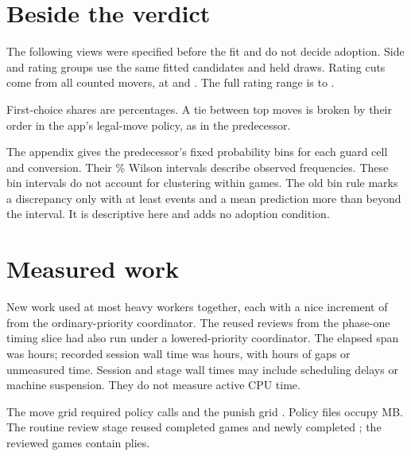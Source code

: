 \documentclass{article}
\begin{document}
\section{Beside the verdict}
The following views were specified before the fit and do not decide
adoption. Side and rating groups use the same fitted candidates and held
draws. Rating cuts come from all counted movers, at \RatingCutLow{} and
\RatingCutHigh. The full rating range is \RatingMin{} to \RatingMax.

\begin{center}\small\GroupTable\end{center}
\ExploratoryComparison{}
\SideFinding{}
\RatingFinding{}

First-choice shares are percentages. A tie between top moves is broken by
their order in the app's legal-move policy, as in the predecessor.

\begin{center}\small\TopTable\end{center}

The appendix gives the predecessor's fixed probability bins for each guard
cell and conversion. Their \OrdinaryCI\% Wilson intervals describe observed frequencies.
These bin intervals do not account for clustering within games.
The old bin rule marks a discrepancy only with at least \BinMinimum{}
events and a mean prediction more than \BinAllowance{} beyond the interval.
It is descriptive here and adds no adoption condition.
\BinFinding{}

\section{Measured work}
New work used at most \MaxWorkers{} heavy workers together, each
with a nice increment of \Nice{} from the ordinary-priority coordinator.
The reused reviews from the phase-one timing slice had also run under a
lowered-priority coordinator.
The elapsed span was \ElapsedHours{} hours; recorded session wall
time was \SessionHours{} hours, with \GapHours{} hours of gaps or unmeasured
time. \RuntimeCaveat{}
Session and stage wall times may include scheduling delays or machine
suspension. They do not measure active CPU time.
\RecoveredTimingNote{}

\begin{center}\small\TimingTable\end{center}

The move grid required \MoveCalls{} policy calls and the punish grid
\PunishCalls. Policy files occupy \PolicyMB{} MB. The routine review stage
reused \ReusedReviews{} completed games and newly completed \NewReviews;
the reviewed games contain \ReviewPlies{} plies.
\TimeoutRecoveryNote{}
\end{document}
